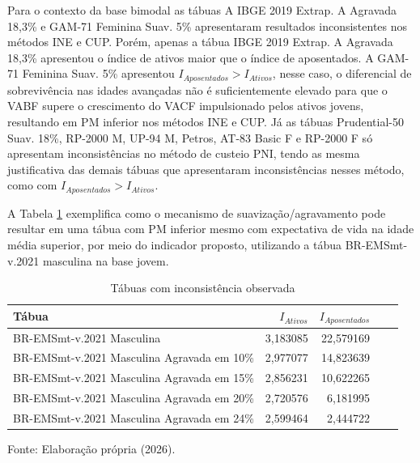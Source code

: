 Para o contexto da base bimodal as tábuas A IBGE 2019 Extrap. A Agravada 18,3\% e GAM-71 Feminina Suav. 5\%  apresentaram resultados inconsistentes nos métodos INE e CUP. Porém, apenas a tábua IBGE 2019 Extrap. A Agravada 18,3\% apresentou o índice de ativos maior que o índice de aposentados. A GAM-71 Feminina Suav. 5\% apresentou $I_{Aposentados} > I_{Ativos}$, nesse caso, o diferencial de sobrevivência nas idades avançadas não é suficientemente elevado para que o VABF supere o crescimento do VACF impulsionado pelos ativos jovens, resultando em PM inferior nos métodos INE e CUP. Já as tábuas Prudential-50 Suav. 18\%, RP-2000 M, UP-94 M, Petros, AT-83 Basic F e RP-2000 F só apresentam inconsistências no método de custeio PNI, tendo as mesma justificativa das demais tábuas que apresentaram inconsistências nesses método, como com $I_{Aposentados} > I_{Ativos}$.

A Tabela \ref{tab:inconsistencias_br_ems} exemplifica como o mecanismo de suavização/agravamento pode resultar em uma tábua com PM inferior mesmo com expectativa de vida na idade média superior, por meio do indicador proposto, utilizando a tábua BR-EMSmt-v.2021 masculina na base jovem.
\vspace{0.25cm}
\begin{table}[htbp]
    \centering
    \caption{Tábuas com inconsistência observada}
    \begin{threeparttable}
    \renewcommand{\arraystretch}{1.2}
    \begin{tabular}{lrrcc}
    \toprule
    \textbf{Tábua} & $I_{Ativos}$ & $I_{Aposentados}$ \\ \midrule
    BR-EMSmt-v.2021 Masculina & 3,183085 & 22,579169 \\
    BR-EMSmt-v.2021 Masculina Agravada em 10\% & 2,977077 & 14,823639 \\
    BR-EMSmt-v.2021 Masculina Agravada em 15\% & 2,856231 & 10,622265 \\
    BR-EMSmt-v.2021 Masculina Agravada em 20\% & 2,720576 & 6,181995 \\
    BR-EMSmt-v.2021 Masculina Agravada em 24\% & 2,599464 & 2,444722 \\ 
    \bottomrule
    \end{tabular}
    \begin{tablenotes}[flushleft]
        \small
        \item Fonte: Elaboração própria (2026).
    \end{tablenotes}
    \end{threeparttable}
    \label{tab:inconsistencias_br_ems}
\end{table}

